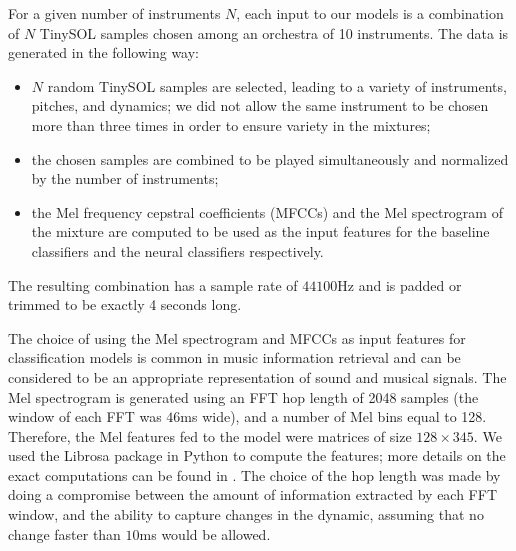 \documentclass{article}
\begin{document}

For a given number of instruments $N$, each input to our models is a combination of $N$ TinySOL samples chosen among an orchestra of 10 instruments. The data is generated in the following way: 

\begin{itemize}
\item $N$ random TinySOL samples are selected, leading to a variety of instruments, pitches, and dynamics; we did not allow the same instrument to be chosen more than three times in order to ensure variety in the mixtures;
\item the chosen samples are combined to be played simultaneously and normalized by the number of instruments;
\item the Mel frequency cepstral coefficients (MFCCs) and the Mel spectrogram of the mixture are computed to be used as the input features for the baseline classifiers and the neural classifiers respectively.
\end{itemize}

The resulting combination has a sample rate of $44100$Hz and is padded or trimmed to be exactly 4 seconds long.

The choice of using the Mel spectrogram and MFCCs as input features for classification models is common in music information retrieval \cite{McKinney2003} and can be considered to be an appropriate representation of sound and musical signals. The Mel spectrogram is generated using an FFT hop length of 2048 samples (the window of each FFT was $46$ms wide), and a number of Mel bins equal to 128. Therefore, the Mel features fed to the model were matrices of size $128\times 345$. We used the Librosa package in Python to compute the features; more details on the exact computations can be found in \cite{mcfee15}. The choice of the hop length was made by doing a compromise between the amount of information extracted by each FFT window, and the ability to capture changes in the dynamic, assuming that no change faster than $10$ms would be allowed.
\end{document}
